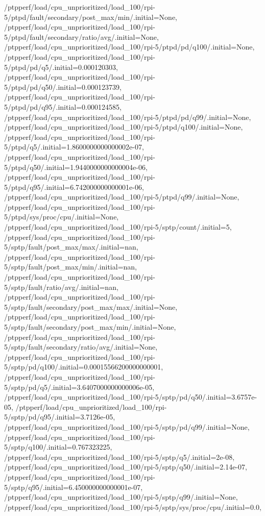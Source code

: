 {    /ptpperf/load/cpu_unprioritized/load_100/rpi-5/ptpd/fault/secondary/post_max/min/.initial=None,
    /ptpperf/load/cpu_unprioritized/load_100/rpi-5/ptpd/fault/secondary/ratio/avg/.initial=None,
    /ptpperf/load/cpu_unprioritized/load_100/rpi-5/ptpd/pd/q100/.initial=None,
    /ptpperf/load/cpu_unprioritized/load_100/rpi-5/ptpd/pd/q5/.initial=0.000120303,
    /ptpperf/load/cpu_unprioritized/load_100/rpi-5/ptpd/pd/q50/.initial=0.000123739,
    /ptpperf/load/cpu_unprioritized/load_100/rpi-5/ptpd/pd/q95/.initial=0.000124585,
    /ptpperf/load/cpu_unprioritized/load_100/rpi-5/ptpd/pd/q99/.initial=None,
    /ptpperf/load/cpu_unprioritized/load_100/rpi-5/ptpd/q100/.initial=None,
    /ptpperf/load/cpu_unprioritized/load_100/rpi-5/ptpd/q5/.initial=1.8600000000000002e-07,
    /ptpperf/load/cpu_unprioritized/load_100/rpi-5/ptpd/q50/.initial=1.9440000000000004e-06,
    /ptpperf/load/cpu_unprioritized/load_100/rpi-5/ptpd/q95/.initial=6.742000000000001e-06,
    /ptpperf/load/cpu_unprioritized/load_100/rpi-5/ptpd/q99/.initial=None,
    /ptpperf/load/cpu_unprioritized/load_100/rpi-5/ptpd/sys/proc/cpu/.initial=None,
    /ptpperf/load/cpu_unprioritized/load_100/rpi-5/sptp/count/.initial=5,
    /ptpperf/load/cpu_unprioritized/load_100/rpi-5/sptp/fault/post_max/max/.initial=nan,
    /ptpperf/load/cpu_unprioritized/load_100/rpi-5/sptp/fault/post_max/min/.initial=nan,
    /ptpperf/load/cpu_unprioritized/load_100/rpi-5/sptp/fault/ratio/avg/.initial=nan,
    /ptpperf/load/cpu_unprioritized/load_100/rpi-5/sptp/fault/secondary/post_max/max/.initial=None,
    /ptpperf/load/cpu_unprioritized/load_100/rpi-5/sptp/fault/secondary/post_max/min/.initial=None,
    /ptpperf/load/cpu_unprioritized/load_100/rpi-5/sptp/fault/secondary/ratio/avg/.initial=None,
    /ptpperf/load/cpu_unprioritized/load_100/rpi-5/sptp/pd/q100/.initial=0.00015566200000000001,
    /ptpperf/load/cpu_unprioritized/load_100/rpi-5/sptp/pd/q5/.initial=3.6407000000000006e-05,
    /ptpperf/load/cpu_unprioritized/load_100/rpi-5/sptp/pd/q50/.initial=3.6757e-05,
    /ptpperf/load/cpu_unprioritized/load_100/rpi-5/sptp/pd/q95/.initial=3.7126e-05,
    /ptpperf/load/cpu_unprioritized/load_100/rpi-5/sptp/pd/q99/.initial=None,
    /ptpperf/load/cpu_unprioritized/load_100/rpi-5/sptp/q100/.initial=0.767323225,
    /ptpperf/load/cpu_unprioritized/load_100/rpi-5/sptp/q5/.initial=2e-08,
    /ptpperf/load/cpu_unprioritized/load_100/rpi-5/sptp/q50/.initial=2.14e-07,
    /ptpperf/load/cpu_unprioritized/load_100/rpi-5/sptp/q95/.initial=6.450000000000001e-07,
    /ptpperf/load/cpu_unprioritized/load_100/rpi-5/sptp/q99/.initial=None,
    /ptpperf/load/cpu_unprioritized/load_100/rpi-5/sptp/sys/proc/cpu/.initial=0.0,
}
